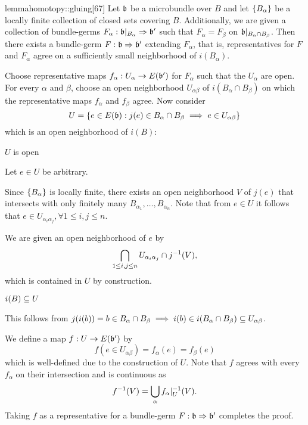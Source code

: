 \begin{mystatement}{lemma}{homotopy::gluing}[67]
    Let $\bb$ be a microbundle over $B$ and let $\{B_\alpha\}$
    be a locally finite collection of closed sets covering $B$.
    Additionally, we are given a collection
    of bundle-germs $\germdef{F_\alpha}{\bb[B_\alpha]}{\bb'}$
    such that $F_\alpha = F_\beta$ on $\bb[B_\alpha \cap B_\beta]$.
    Then there exists a bundle-germ $\germdef{F}{\bb}{\bb'}$ extending $F_\alpha$,
    that is, representatives for $F$ and $F_\alpha$ agree on a sufficiently small neighborhood of $i(B_\alpha)$.
\end{mystatement}

\begin{myproof}
    Choose representative maps $f_\alpha: U_\alpha \to E(\bb')$ for $F_\alpha$ such that the $U_\alpha$ are open.
    For every $\alpha$ and $\beta$, choose an open neighborhood $U_{\alpha\beta}$ of $i(B_\alpha \cap B_\beta)$ on which the representative maps $f_\alpha$ and $f_\beta$ agree.
    Now consider
    \[ U = \set{ e \in E(\bb)}{j(e) \in B_\alpha \cap B_\beta \implies e \in U_{\alpha\beta}} \]
    which is an open neighborhood of $i(B)$:
    \begin{sectionize}
        \item $U$ is open

        Let $e \in U$ be arbitrary.

        Since $\{B_\alpha\}$ is locally finite,
        there exists an open neighborhood $V$ of $j(e)$
        that intersects with only finitely many $B_{\alpha_1}, \dots, B_{\alpha_n}$.
        Note that from $e \in U$ it follows that $e \in U_{\alpha_i\alpha_j}, \forall 1 \le i, j \le n$.

        We are given an open neighborhood of $e$ by
        \[ \bigcap_{1 \le i, j \le n} U_{\alpha_i\alpha_j} \cap j^{-1}(V), \]
        which is contained in $U$ by construction.

        \item $i(B) \subseteq{} U$
        
        This follows from
        $j(i(b)) = b \in B_\alpha \cap B_\beta \implies i(b) \in i(B_\alpha \cap B_\beta) \subseteq{} U_{\alpha\beta}$.
    \end{sectionize}
    We define a map $f: U \to E(\bb')$ by
    \[ f(e \in U_{\alpha\beta}) = f_\alpha(e) = f_\beta(e) \]
    which is well-defined due to the construction of $U$.
    Note that $f$ agrees with every $f_\alpha$ on their intersection
    and is continuous as
    \[ f^{-1}(V) = \bigcup_{\alpha} f_\alpha\vert_{U}^{-1}(V). \]
    Taking $f$ as a representative for a bundle-germ $\germdef{F}{\bb}{\bb'}$
    completes the proof.
\end{myproof}